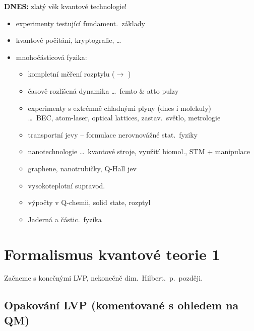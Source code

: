 \documentclass[11pt,a4paper]{article}
\begin{document}
\textbf{DNES:} zlatý věk kvantové technologie! 
\begin{itemize}[nosep]
  \item experimenty testující fundament.\ základy 
  \item kvantové počítání, kryptografie, \dots
  \item mnohočásticová fyzika:
  \begin{itemize}[nosep]
    \item kompletní měření  rozptylu \quad ($\to$ )
    \item časově rozlišená dynamika \dots\ femto \& atto pulzy
    \item experimenty s extrémně chladnými plyny (dnes i molekuly)  \\
          \dots\ BEC, atom-laser, optical lattices, zastav.\ světlo, metrologie
    \item transportní jevy -- formulace nerovnovážné stat.\ fyziky
    \item nanotechnologie \dots\ kvantové stroje, využití biomol., STM + manipulace
    \item graphene, nanotrubičky, Q-Hall jev 
    \item vysokoteplotní supravod.
    \item {} výpočty v Q-chemii, solid state, rozptyl 
    \item Jaderná a částic.\ fyzika 
  \end{itemize}
\end{itemize}

\section{Formalismus kvantové teorie 1}

Začneme s konečnými LVP, nekonečně dim.\ Hilbert.\ p.\ později.

\subsection{Opakování LVP (komentované s ohledem na QM)}
\end{document}
